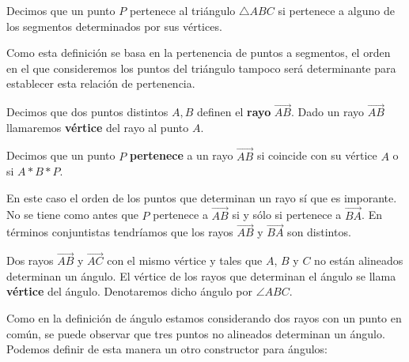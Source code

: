 \begin{defin*}
	Decimos que un punto $P$ pertenece al triángulo $\triangle ABC$ si pertenece
	a alguno de los segmentos determinados por sus vértices.
\end{defin*}


Como esta definición se basa en la pertenencia de puntos a segmentos, el orden
en el que consideremos los puntos del triángulo tampoco será determinante para
establecer esta relación de pertenencia.

\begin{defin*}[Rayos]
	Decimos que dos puntos distintos $A, B$ definen el \textbf{rayo}
	$\overrightarrow{AB}$. Dado un rayo $\overrightarrow{AB}$ llamaremos
	\textbf{vértice} del rayo al punto $A$.
\end{defin*}


\begin{defin}
	Decimos que un punto $P$ \textbf{pertenece} a un rayo $\overrightarrow{AB}$
	si coincide con su vértice $A$ o si $A * B * P$.
\end{defin}


En este caso el orden de los puntos que determinan un rayo sí que es imporante.
No se tiene como antes que $P$ pertenece a $\overrightarrow{AB}$ si y sólo si
pertenece a $\overrightarrow{BA}$. En términos conjuntistas tendríamos que los
rayos $\overrightarrow{AB}$ y $\overrightarrow{BA}$ son distintos.

\begin{defin*}[Ángulos]
	Dos rayos $\overrightarrow{AB}$ y $\overrightarrow{AC}$ con el mismo vértice
	y tales que $A$, $B$ y $C$ no están alineados determinan un ángulo.
	El vértice de los rayos que determinan el ángulo se llama \textbf{vértice}
	del ángulo. Denotaremos dicho ángulo por $\angle ABC$.
\end{defin*}


Como en la definición de ángulo estamos considerando dos rayos con un punto en
común, se puede observar que tres puntos no alineados determinan un ángulo.
Podemos definir de esta manera un otro constructor para ángulos:


